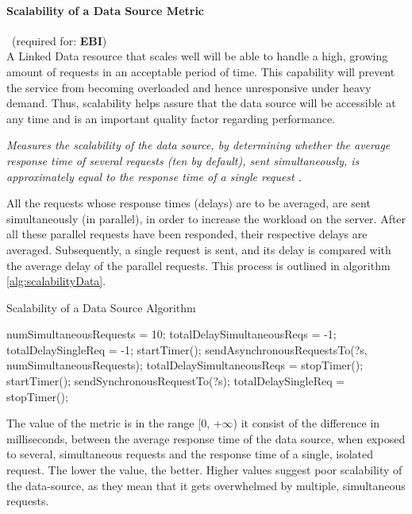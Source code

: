 

\paragraph{Scalability of a Data Source Metric}~(required for: \textbf{EBI}) ~\\ %
A Linked Data resource that scales well will be able to handle a high, growing amount of requests in an acceptable period of time. This capability will prevent the service from becoming overloaded and hence unresponsive under heavy demand. Thus, scalability helps assure  that the data source will be accessible at any time and is an important quality factor regarding performance.
\begin{mdframed}[style=metricdefinition]
\emph{Measures the scalability of the data source, by determining whether the average response time of several requests (ten by default), sent simultaneously, is approximately equal to the response time of a single request \cite{Flemming2008}.}
\end{mdframed}

All the requests whose response times (delays) are to be averaged, are sent simultaneously (in parallel), in order to increase the workload on the server. After all these parallel requests have been responded, their respective delays are averaged. Subsequently, a single request is sent, and its delay is compared with the average delay of the parallel requests. This process is outlined in algorithm \ref{alg:scalabilityData}.
\begin{algorithm}
\caption{Scalability of a Data Source Algorithm} \label{alg:scalabilityData}
\begin{algorithmic}[1]
\State numSimultaneousRequests = 10;
\State totalDelaySimultaneousReqs = -1;
\State totalDelaySingleReq = -1;
\EndProcedure
{}
\State startTimer();
\State sendAsynchronousRequestsTo(?s, numSimultaneousRequests);
\State totalDelaySimultaneousReqs = stopTimer();
\State startTimer();
\State sendSynchronousRequestTo(?s);
\State totalDelaySingleReq = stopTimer();
\EndIf
{}
\EndProcedure
\end{algorithmic}
\end{algorithm}
The value of the metric is in the range [0, +$\infty$) it consist of the difference in milliseconds, between the average response time of the data source, when exposed to several, simultaneous requests and the response time of a single, isolated request. The lower the value, the better. Higher values suggest poor scalability of the data-source, as they mean that it gets overwhelmed by multiple, simultaneous requests.

